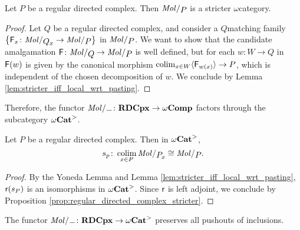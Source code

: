 \begin{prop} \label{prop:regular_directed_complex_stricter}
    Let \( P \) be a regular directed complex.
    Then \( \molecin{P} \) is a stricter \( \omega \)\nbd category.
\end{prop}
\begin{proof}
    Let \( Q \) be a regular directed complex, and consider a \( Q \)\nbd matching family \( \set{\F_x \colon \molecin{\imel{Q}{x}} \to \molecin{P}} \) in \( \molecin{P} \).
    We want to show that the candidate amalgamation \( \F \colon \molecin{Q} \to \molecin{P} \) is well defined, but for each \( w \colon W \to Q \) in \( \mathsf{F}(w) \) is given by the canonical morphism \( \operatorname*{colim}_{x \in W} \langle\mathsf{F}_{w(x)}\rangle \to P \), which is independent of the chosen decomposition of \( w \).
    We conclude by Lemma \ref{lem:stricter_iff_local_wrt_pasting}.
\end{proof}

\noindent Therefore, the functor \( \molecin{-} \colon \rdcpx \to \Comp \) factors through the subcategory \( {\omega\mathbf{Cat}}^> \).

\begin{cor} \label{cor:regular_directed_complex_colimit_of_itself}
    Let \( P \) be a regular directed complex.
    Then in \( {\omega\mathbf{Cat}}^> \),
    \begin{equation*}
        s_p \colon \colim_{x \in P} \molecin{\imel{P}{x}} \cong \molecin{P}.
    \end{equation*}
\end{cor}
\begin{proof}
    By the Yoneda Lemma and Lemma \ref{lem:stricter_iff_local_wrt_pasting}, \( \mathsf{r}(s_P) \) is an isomorphisms in \( {\omega\mathbf{Cat}}^> \).
    Since \( \mathsf{r} \) is left adjoint, we conclude by Proposition \ref{prop:regular_directed_complex_stricter}.
\end{proof}

\begin{cor} \label{cor:molecin_preserves_pushout_inclusions} 
    The functor \( \molecin{-} \colon \rdcpx \to \somegaCat \) preserves all pushouts of inclusions. 
\end{cor}

